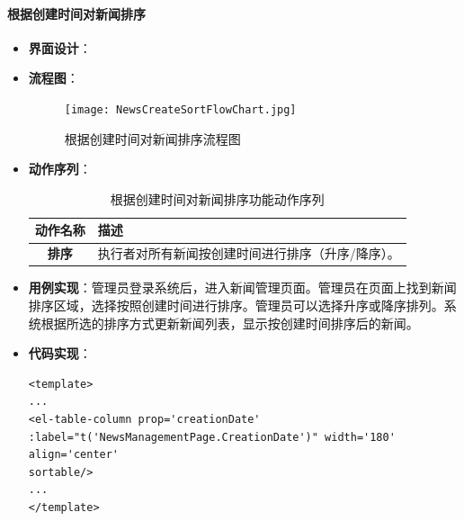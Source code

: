 \paragraph{根据创建时间对新闻排序}
\begin{itemize}
	\item \textbf{界面设计}：
	\item \textbf{流程图}：
	\begin{figure}[H]
		\centering
		\texttt{[image: NewsCreateSortFlowChart.jpg]}
		\caption{根据创建时间对新闻排序流程图}
		\label{NewsCreateSortFlowChart}
	\end{figure}
	\item \textbf{动作序列}：
	\begin{table}[H]
		\centering
		\caption{根据创建时间对新闻排序功能动作序列}
		\renewcommand\arraystretch{1.5}
		\begin{tabular}{|c|>{\raggedright\arraybackslash}p{10cm}|}
			\hline
			\textbf{动作名称} & \textbf{描述} \\ \hline
			\textbf{排序} & 执行者对所有新闻按创建时间进行排序（升序/降序）。 \\ \hline
		\end{tabular}
	\end{table}
	\item \textbf{用例实现}：管理员登录系统后，进入新闻管理页面。管理员在页面上找到新闻排序区域，选择按照创建时间进行排序。管理员可以选择升序或降序排列。系统根据所选的排序方式更新新闻列表，显示按创建时间排序后的新闻。
	\item \textbf{代码实现}：
	\begin{verbatim}
<template>
...
<el-table-column prop='creationDate' :label="t('NewsManagementPage.CreationDate')" width='180' align='center'
sortable/>
...
</template>
	\end{verbatim}
\end{itemize}


